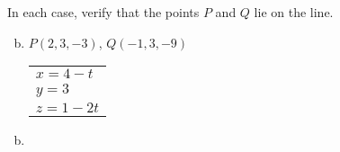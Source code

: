 \documentclass[../main.tex]{subfiles}
\begin{document}
In each case, verify that the points $P$ and $Q$ lie on the line.
\begin{enumerate}[a)]
	\setcounter{enumi}{1}
	\item $P(2, 3, -3)$, $Q(-1, 3, -9)$

		\begin{tabular}{l}
			$x = 4 - t$ \\
		 	$y = 3$ \\
			$z = 1 - 2t$
		\end{tabular}
\end{enumerate}

\solution
\begin{enumerate}[a)]
	\setcounter{enumi}{1}
	\item 
\end{enumerate}
\end{document}
